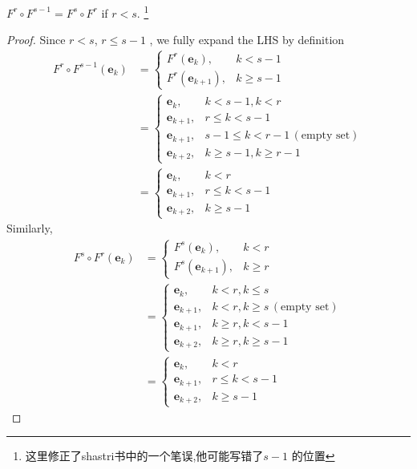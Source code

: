 \documentclass[../main.tex]{subfiles}
\begin{document}
\begin{lemma}{}{}
$F^r \circ F^{s-1} = F^{s} \circ F^r$ if $r < s$. \footnote{这里修正了shastri书中的一个笔误,他可能写错了\(  s-1  \)    的位置}
\end{lemma}
\begin{proof}
    Since \(  r< s  \), \(  r\le s-1  \)  , we fully expand the LHS by definition
   \[
   \begin{aligned}
   F^{r}\circ F^{s-1}\left( \mathbf{e}_{k} \right)&= \begin{cases} F^{r}\left( \mathbf{e}_{k} \right),& k< s-1\\ 
    F^{r}\left( \mathbf{e}_{k+ 1} \right),& k\ge s-1   \end{cases}\\ 
    &= \begin{cases} \mathbf{e}_{k},&k< s-1 , k< r\\ 
     \mathbf{e}_{k+ 1},&  r\le k< s-1\\ 
      \mathbf{e}_{k+ 1},& s-1\le k< r-1 \,(\text{empty set})\\ 
       \mathbf{e}_{k+ 2},& k\ge s-1, k\ge r-1 \end{cases}\\ 
        &= \begin{cases} \mathbf{e}_{k},&k< r\\ 
         \mathbf{e}_{k+ 1},&r\le k< s-1\\ 
          \mathbf{e}_{k+ 2},&k\ge s-1 \end{cases}     
   \end{aligned}
   \] Similarly,  \[
\begin{aligned}
   F^{s}\circ F^{r}\left( \mathbf{e}_{k} \right)&= \begin{cases}
F^{s}\left( \mathbf{e}_{k} \right),& k< r\\ 
 F^{s}\left( \mathbf{e}_{k+ 1} \right),&k\ge r    \end{cases}\\ 
  &= \begin{cases} \mathbf{e}_{k},&k<  r,k\le s\\ 
   \mathbf{e}_{k+ 1},&k< r,k\ge s \,(\text{empty set})\\ 
    \mathbf{e}_{k+ 1},&k\ge  r,k< s-1\\ 
     \mathbf{e}_{k+ 2}, &k\ge r,k\ge s -1\end{cases} \\ 
      &= \begin{cases} \mathbf{e}_{k},& k<  r\\ 
        \mathbf{e}_{k+ 1},& r\le  k< s-1\\ 
         \mathbf{e}_{k+ 2},&k\ge s-1
         \end{cases} 
\end{aligned}
   \]
\end{proof}
\end{document}
